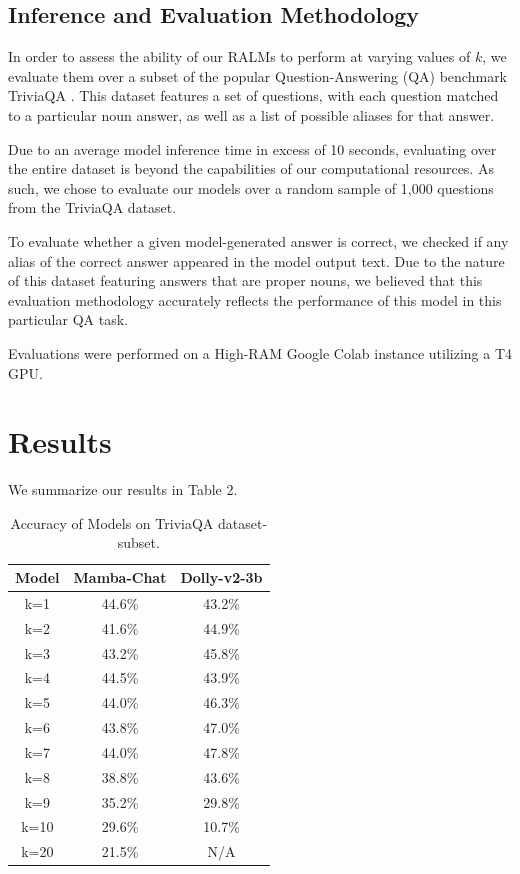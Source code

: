 \documentclass[11pt]{article}
\begin{document}
\subsection{Inference and Evaluation Methodology}
In order to assess the ability of our RALMs to perform at varying values of $k$, we evaluate them over a subset of the popular Question-Answering (QA) benchmark TriviaQA \cite{Joshi2017TriviaQAAL}. This dataset features a set of questions, with each question matched to a particular noun answer, as well as a list of possible aliases for that answer.

Due to an average model inference time in excess of 10 seconds, evaluating over the entire dataset is beyond the capabilities of our computational resources. As such, we chose to evaluate our models over a random sample of 1,000 questions from the TriviaQA dataset.

To evaluate whether a given model-generated answer is correct, we checked if any alias of the correct answer appeared in the model output text. Due to the nature of this dataset featuring answers that are proper nouns, we believed that this evaluation methodology accurately reflects the performance of this model in this particular QA task.

Evaluations were performed on a High-RAM Google Colab instance utilizing a T4 GPU.
\section{Results}
We summarize our results in Table 2.
\begin{table}[h]
    \centering
    \begin{tabular}{|c|c|c|} 
     \hline
     \textbf{Model} & Mamba-Chat & Dolly-v2-3b \\
     \hline\hline
     k=1 & 44.6\% & 43.2\% \\ 
     \hline
     k=2 & 41.6\% & 44.9\% \\
     \hline
     k=3 & 43.2\% & 45.8\% \\
     \hline
     k=4 & 44.5\% & 43.9\% \\
     \hline
     k=5 & 44.0\% & 46.3\% \\
     \hline
     k=6 & 43.8\% & 47.0\% \\
     \hline
     k=7 & 44.0\% & 47.8\% \\
     \hline
     k=8 & 38.8\% & 43.6\% \\
     \hline
     k=9 & 35.2\% & 29.8\% \\
     \hline
     k=10 & 29.6\% & 10.7\% \\
     \hline
     k=20 & 21.5\% & N/A \\
     \hline
    \end{tabular}
    \caption{Accuracy of Models on TriviaQA dataset-subset.}
    \label{tab:my_label}
\end{table}
\newline
\end{document}
